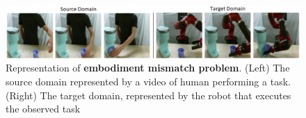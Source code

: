 \begin{figure}[t]
    
    \includegraphics[width=\textwidth]{figures/images/embodiment_mismatch/embo.jpg}
    \caption{Representation of \textbf{embodiment mismatch problem}. (Left) The source domain
    represented by a video of human performing a task. (Right) The target domain, represented
    by the robot that executes the observed task}
    \label{fig:embo_mismatch}
    
\end{figure}
